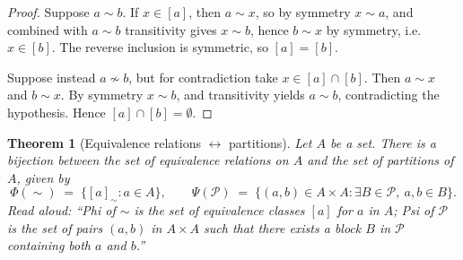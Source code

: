 \documentclass[11pt]{article}
\newtheorem{theorem}{Theorem}
\theoremstyle{definition}
\begin{document}
\begin{proof}
Suppose $a \sim b$. If $x \in [a]$, then $a \sim x$, so by symmetry $x \sim a$, and combined with $a \sim b$ transitivity gives $x \sim b$, hence $b \sim x$ by symmetry, i.e. $x \in [b]$. The reverse inclusion is symmetric, so $[a] = [b]$.

Suppose instead $a \not\sim b$, but for contradiction take $x \in [a] \cap [b]$. Then $a \sim x$ and $b \sim x$. By symmetry $x \sim b$, and transitivity yields $a \sim b$, contradicting the hypothesis. Hence $[a] \cap [b] = \emptyset$.
\end{proof}

\begin{theorem}[Equivalence relations $\leftrightarrow$ partitions]\label{thm:eq-partition}
Let $A$ be a set. There is a bijection between the set of equivalence relations on $A$ and the set of partitions of $A$, given by
\[
\Phi(\sim) \;=\; \{ [a]_\sim : a \in A \},
\qquad
\Psi(\mathcal{P}) \;=\; \{ (a, b) \in A \times A : \exists B \in \mathcal{P},\ a, b \in B \}.
\]
\emph{Read aloud:} ``Phi of $\sim$ is the set of equivalence classes $[a]$ for $a$ in $A$; Psi of $\mathcal{P}$ is the set of pairs $(a,b)$ in $A \times A$ such that there exists a block $B$ in $\mathcal{P}$ containing both $a$ and $b$.''
\end{theorem}
\end{document}
